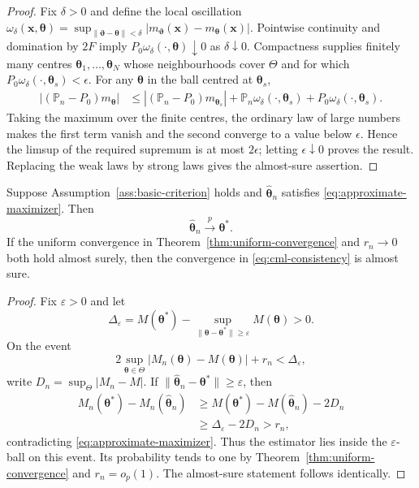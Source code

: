 \begin{proof}
Fix $\delta>0$ and define the local oscillation
$\omega_\delta(\mathbf x,\boldsymbol\theta)=
\sup_{\|\boldsymbol\vartheta-\boldsymbol\theta\|<\delta}
|m_{\boldsymbol\vartheta}(\mathbf x)-m_{\boldsymbol\theta}(\mathbf x)|$.
Pointwise continuity and domination by $2F$ imply
$P_0\omega_\delta(\cdot,\boldsymbol\theta)\downarrow0$ as $\delta\downarrow0$.
Compactness supplies finitely many centres
$\boldsymbol\theta_1,\ldots,\boldsymbol\theta_N$ whose neighbourhoods cover
$\Theta$ and for which $P_0\omega_\delta(\cdot,\boldsymbol\theta_s)<\epsilon$.
For any $\boldsymbol\theta$ in the ball centred at $\boldsymbol\theta_s$,
\begin{align*}
 |(\mathbb P_n-P_0)m_{\boldsymbol\theta}|
 &\leq |(\mathbb P_n-P_0)m_{\boldsymbol\theta_s}|
 +\mathbb P_n\omega_\delta(\cdot,\boldsymbol\theta_s)
 +P_0\omega_\delta(\cdot,\boldsymbol\theta_s).
\end{align*}
Taking the maximum over the finite centres, the ordinary law of large numbers
makes the first term vanish and the second converge to a value below
$\epsilon$. Hence the limsup of the required supremum is at most $2\epsilon$;
letting $\epsilon\downarrow0$ proves the result. Replacing the weak laws by
strong laws gives the almost-sure assertion.
\end{proof}

\begin{theorem}
\label{thm:cml-consistency}
Suppose Assumption~\ref{ass:basic-criterion} holds and
$\widehat{\boldsymbol{\theta}}_n$ satisfies \eqref{eq:approximate-maximizer}.  Then
\begin{equation}
 \widehat{\boldsymbol{\theta}}_n\xrightarrow{p}\boldsymbol{\theta}^*.
 \label{eq:cml-consistency}
\end{equation}
If the uniform convergence in Theorem~\ref{thm:uniform-convergence} and
$r_n\to0$ both hold almost surely, then the convergence in
\eqref{eq:cml-consistency} is almost sure.
\end{theorem}

\begin{proof}
Fix $\varepsilon>0$ and let
\[
 \Delta_\varepsilon=M(\boldsymbol{\theta}^*)-
 \sup_{\|\boldsymbol{\theta}-\boldsymbol{\theta}^*\|\geq\varepsilon}M(\boldsymbol{\theta})>0.
\]
On the event
\[
 2\sup_{\boldsymbol{\theta}\in\Theta}|M_n(\boldsymbol{\theta})-M(\boldsymbol{\theta})|+r_n
 <\Delta_\varepsilon,
\]
write $D_n=\sup_{\Theta}|M_n-M|$. If
$\|\widehat{\boldsymbol\theta}_n-\boldsymbol\theta^*\|\geq\varepsilon$, then
\begin{align*}
 M_n(\boldsymbol\theta^*)-M_n(\widehat{\boldsymbol\theta}_n)
 &\geq M(\boldsymbol\theta^*)-M(\widehat{\boldsymbol\theta}_n)-2D_n\\
 &\geq\Delta_\varepsilon-2D_n>r_n,
\end{align*}
contradicting \eqref{eq:approximate-maximizer}. Thus the estimator lies inside
the $\varepsilon$-ball on this event. Its probability tends to one by
Theorem~\ref{thm:uniform-convergence} and $r_n=o_p(1)$.
The almost-sure statement follows identically.
\end{proof}

